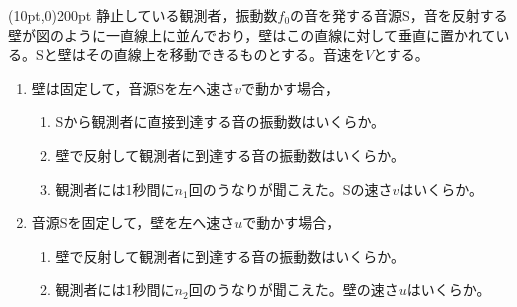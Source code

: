 \hakosyokika
\item
    \begin{mawarikomi}(10pt,0){200pt}{}
    静止している観測者，振動数$f_0$の音を発する音源S，音を反射する壁が図のように一直線上に並んでおり，壁はこの直線に対して垂直に置かれている。Sと壁はその直線上を移動できるものとする。音速を$V$とする。
        \begin{enumerate}
            \item 壁は固定して，音源Sを左へ速さ$v$で動かす場合，
                \begin{enumerate}
                    \item Sから観測者に直接到達する音の振動数はいくらか。
                    \item 壁で反射して観測者に到達する音の振動数はいくらか。
                    \item 観測者には1秒間に$n_1$回のうなりが聞こえた。Sの速さ$v$はいくらか。
                \end{enumerate}
            \item 音源Sを固定して，壁を左へ速さ$u$で動かす場合，
                \begin{enumerate}
                    \item 壁で反射して観測者に到達する音の振動数はいくらか。
                    \item 観測者には1秒間に$n_2$回のうなりが聞こえた。壁の速さ$u$はいくらか。
                \end{enumerate}
        \end{enumerate}
    \end{mawarikomi}